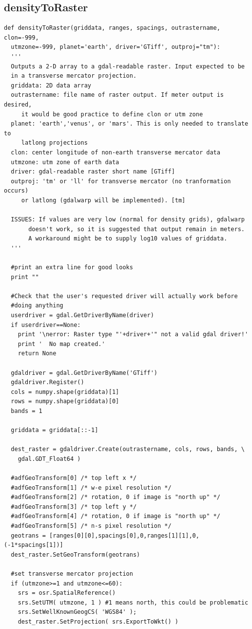 \documentclass[12pt,letter]{article}
\begin{document}
\subsection{densityToRaster}
\begin{verbatim}
def densityToRaster(griddata, ranges, spacings, outrastername, clon=-999, 
  utmzone=-999, planet='earth', driver='GTiff', outproj="tm"):
  '''
  Outputs a 2-D array to a gdal-readable raster. Input expected to be
  in a transverse mercator projection.
  griddata: 2D data array
  outrastername: file name of raster output. If meter output is desired,
     it would be good practice to define clon or utm zone
  planet: 'earth','venus', or 'mars'. This is only needed to translate to
     latlong projections
  clon: center longitude of non-earth transverse mercator data
  utmzone: utm zone of earth data
  driver: gdal-readable raster short name [GTiff]
  outproj: 'tm' or 'll' for transverse mercator (no tranformation occurs)
     or latlong (gdalwarp will be implemented). [tm]
     
  ISSUES: If values are very low (normal for density grids), gdalwarp 
       doesn't work, so it is suggested that output remain in meters.
       A workaround might be to supply log10 values of griddata.
  '''
  
  #print an extra line for good looks
  print ""
  
  #Check that the user's requested driver will actually work before
  #doing anything
  userdriver = gdal.GetDriverByName(driver)
  if userdriver==None:
    print '\nerror: Raster type "'+driver+'" not a valid gdal driver!'
    print '  No map created.'
    return None
  
  gdaldriver = gdal.GetDriverByName('GTiff')
  gdaldriver.Register()
  cols = numpy.shape(griddata)[1]
  rows = numpy.shape(griddata)[0]
  bands = 1
  
  griddata = griddata[::-1]
  
  dest_raster = gdaldriver.Create(outrastername, cols, rows, bands, \
    gdal.GDT_Float64 )

  #adfGeoTransform[0] /* top left x */
  #adfGeoTransform[1] /* w-e pixel resolution */
  #adfGeoTransform[2] /* rotation, 0 if image is "north up" */
  #adfGeoTransform[3] /* top left y */
  #adfGeoTransform[4] /* rotation, 0 if image is "north up" */
  #adfGeoTransform[5] /* n-s pixel resolution */  
  geotrans = [ranges[0][0],spacings[0],0,ranges[1][1],0,(-1*spacings[1])]
  dest_raster.SetGeoTransform(geotrans)
  
  #set transverse mercator projection
  if (utmzone>=1 and utmzone<=60):
    srs = osr.SpatialReference()
    srs.SetUTM( utmzone, 1 ) #1 means north, this could be problematic
    srs.SetWellKnownGeogCS( 'WGS84' );
    dest_raster.SetProjection( srs.ExportToWkt() )


\end{verbatim}
\end{document}
